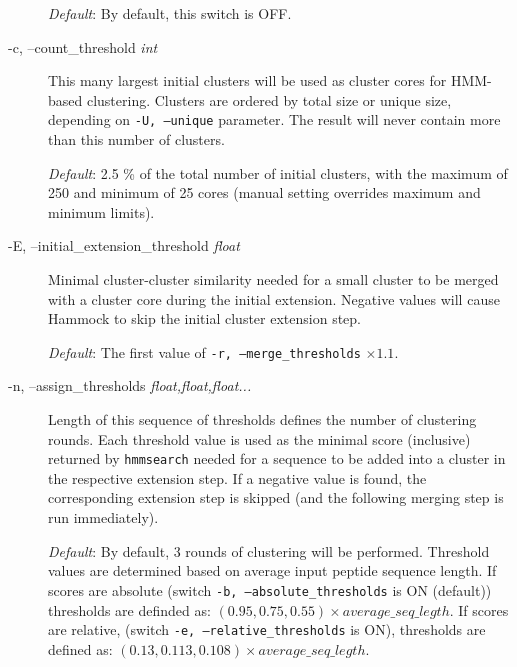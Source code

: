 \documentclass[11pt, a4paper, twoside, titlepage]{article}
\begin{document}
\begin{description}
	  	  \textit{Default}: By default, this switch is OFF.
	  
	  \item[-c, --count\_threshold \rm \textlangle \textit{int}\textrangle] This many largest initial clusters will be used as cluster cores for HMM-based clustering. Clusters are ordered by total size or unique size, depending on \texttt{-U, --unique} parameter. The result will never contain more than this number of clusters.
	 
	  \textit{Default}: 2.5 \% of the total number of initial clusters, with the maximum of 250 and minimum of 25 cores (manual setting overrides maximum and minimum limits).
	  
	  	  	  \item[-E, --initial\_extension\_threshold \rm \textlangle \textit{float}\textrangle] Minimal cluster-cluster similarity needed for a small cluster to be merged with a cluster core during the initial extension. Negative values will cause Hammock to skip the initial cluster extension step.
	  	  	  
\begin{sloppypar}
	 
	  \textit{Default}: The first value of \texttt{-r, --merge\_thresholds} $\times 1.1$.

\end{sloppypar}	  
	  
	  	  \item[-n, --assign\_thresholds \rm \textlangle \textit{float,float,float...}\textrangle] Length of this sequence of thresholds defines the number of clustering rounds. Each threshold value is used as the minimal score (inclusive) returned by \texttt{hmmsearch} needed for a sequence to be added into a cluster in the respective extension step. If a negative value is found, the corresponding extension step is skipped (and the following merging step is run immediately).
	 
\begin{sloppypar}
	 
	  \textit{Default}: By default, 3 rounds of clustering will be performed. Threshold values are determined based on average input peptide sequence length. If scores are absolute (switch \texttt{-b, --absolute\_thresholds} is ON (default)) thresholds are definded as: $(0.95, 0.75, 0.55)\times average\_seq\_legth$. If scores are relative, (switch \texttt{-e, --relative\_thresholds} is ON),  thresholds are defined as: $(0.13, 0.113, 0.108)\times average\_seq\_legth$.


\end{sloppypar}
\end{description}
\end{document}
